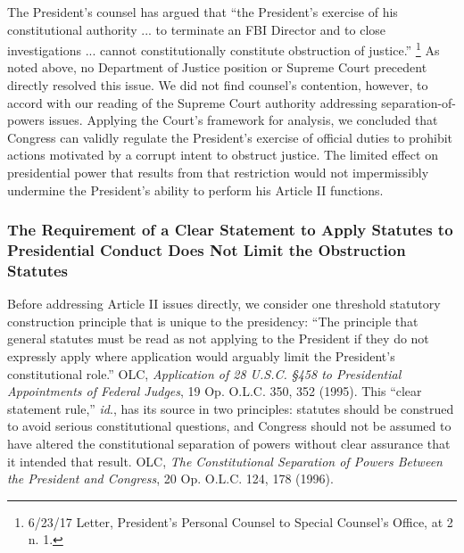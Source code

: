 The President’s counsel has argued that “the President’s exercise of his constitutional authority ... to terminate an FBI Director and to close investigations ... cannot constitutionally constitute obstruction of justice.”%
\footnote{6/23/17 Letter, President’s Personal Counsel to Special Counsel’s Office, at 2 n. 1.}
As noted above, no Department of Justice position or Supreme Court precedent directly resolved this issue.
We did not find counsel’s contention, however, to accord with our reading of the Supreme Court authority addressing separation-of-powers issues.
Applying the Court’s framework for analysis, we concluded that Congress can validly regulate the President’s exercise of official duties to prohibit actions motivated by a corrupt intent to obstruct justice.
The limited effect on presidential power that results from that restriction would not impermissibly undermine the President’s ability to perform his Article II functions.

\subsubsection{The Requirement of a Clear Statement to Apply Statutes to Presidential Conduct Does Not Limit the Obstruction Statutes}

Before addressing Article II issues directly, we consider one threshold statutory construction principle that is unique to the presidency: “The principle that general statutes must be read as not applying to the President if they do not expressly apply where application would arguably limit the President’s constitutional role.”
OLC, \textit{Application of 28 U.S.C. \S 458 to Presidential Appointments of Federal Judges}, 19 Op. O.L.C. 350, 352 (1995).
This “clear statement rule,” \textit{id}., has its source in two principles: statutes should be construed to avoid serious constitutional questions, and Congress should not be assumed to have altered the constitutional separation of powers without clear assurance that it intended that result.
OLC, \textit{The Constitutional Separation of Powers Between the President and Congress}, 20 Op. O.L.C. 124, 178 (1996).

